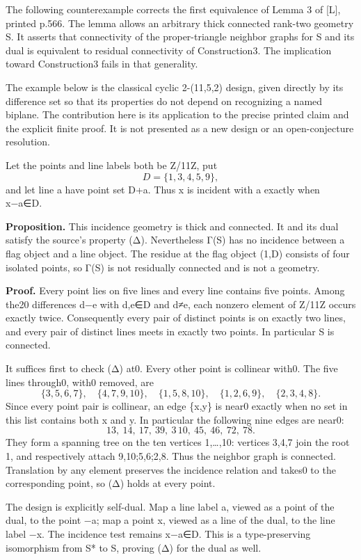 The following counterexample corrects the first equivalence of Lemma 3
of {[}L{]}, printed p.566. The lemma allows an arbitrary thick connected
rank-two geometry S. It asserts that connectivity of the proper-triangle
neighbor graphs for S and its dual is equivalent to residual
connectivity of Construction3. The implication toward Construction3
fails in that generality.

The example below is the classical cyclic 2-(11,5,2) design, given
directly by its difference set so that its properties do not depend on
recognizing a named biplane. The contribution here is its application to
the precise printed claim and the explicit finite proof. It is not
presented as a new design or an open-conjecture resolution.

Let the points and line labels both be Z/11Z, put \[
D=\{1,3,4,5,9\},
\] and let line a have point set D+a. Thus x is incident with a exactly
when x−a∈D.

\textbf{Proposition.} This incidence geometry is thick and connected. It
and its dual satisfy the source's property (Δ). Nevertheless Γ(S) has no
incidence between a flag object and a line object. The residue at the
flag object (1,D) consists of four isolated points, so Γ(S) is not
residually connected and is not a geometry.

\textbf{Proof.} Every point lies on five lines and every line contains
five points. Among the20 differences d−e with d,e∈D and d≠e, each
nonzero element of Z/11Z occurs exactly twice. Consequently every pair
of distinct points is on exactly two lines, and every pair of distinct
lines meets in exactly two points. In particular S is connected.

It suffices first to check (Δ) at0. Every other point is collinear
with0. The five lines through0, with0 removed, are \[
\{3,5,6,7\},\quad
\{4,7,9,10\},\quad
\{1,5,8,10\},\quad
\{1,2,6,9\},\quad
\{2,3,4,8\}.
\] Since every point pair is collinear, an edge \{x,y\} is near0 exactly
when no set in this list contains both x and y. In particular the
following nine edges are near0: \[
13,\ 14,\ 17,\ 39,\ 3\,10,\ 45,\ 46,\ 72,\ 78.
\] They form a spanning tree on the ten vertices 1,\ldots,10:
vertices 3,4,7 join the root 1, and respectively attach 9,10;5,6;2,8. Thus
the neighbor graph is connected. Translation by any element preserves
the incidence relation and takes0 to the corresponding point, so (Δ)
holds at every point.

The design is explicitly self-dual. Map a line label a, viewed as a
point of the dual, to the point −a; map a point x, viewed as a line of
the dual, to the line label −x. The incidence test remains x−a∈D. This
is a type-preserving isomorphism from S* to S, proving (Δ) for the dual
as well.

